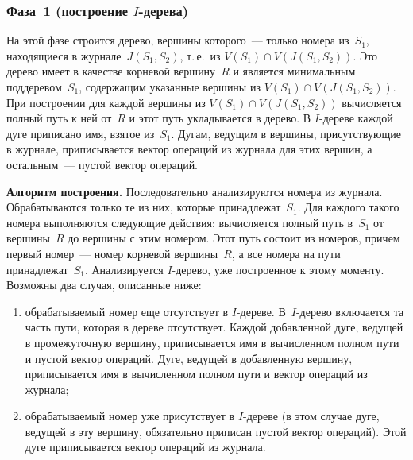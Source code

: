 \begin{multicols}{2}
\vspace*{-3pt}
\subsubsection{Фаза~1 (построение $I$-дерева)} %

      На этой фазе строится дерево, вершины которого~--- только номера 
из~$S_1$, находящиеся в журнале~$J(S_1, S_2)$, т.\,е.\ из $V(S_1)\cap V(J(S_1, 
S_2))$. Это дерево имеет в качестве корневой вершину~$R$ и является 
минимальным поддеревом~$S_1$, содержащим указанные вершины из 
$V(S_1)\cap V(J(S_1, S_2))$. При построении для каждой вершины из $V(S_1)\cap 
V(J(S_1, S_2))$ вычисляется полный путь к ней от~$R$ и этот путь укладывается 
в дерево. В $I$-дереве каждой дуге приписано имя, взятое из~$S_1$. Дугам, 
ведущим в вершины, присутствующие в журнале, приписывается вектор 
операций из журнала для этих вершин, а остальным~--- пустой вектор 
операций.

      \smallskip
      
      \noindent
      \textbf{Алгоритм построения.} Последовательно анализируются 
номера из журнала. Обрабатываются только те из них, которые 
принадлежат~$S_1$. Для каждого такого номера выполняются следующие 
действия:
вычисляется полный путь в~$S_1$ от вершины~$R$ до вершины с этим 
номером. Этот путь состоит из номеров, причем первый номер~--- номер 
корневой вершины~$R$, а все номера на пути принадлежат~$S_1$. 
Анализируется $I$-дерево, уже построенное к этому моменту. Возможны 
два случая, описанные ниже:
\begin{enumerate}[(1)]
\item обрабатываемый номер еще отсутствует в $I$-де\-ре\-ве. В~$I$-дерево 
включается та часть пути, которая в дереве отсутствует. Каждой 
до\-бав\-лен\-ной дуге, ведущей в промежуточную вершину, приписывается имя 
в вычисленном полном пути и пустой вектор операций. Дуге, ведущей в 
добавленную вершину, приписывается имя в вычисленном полном пути и 
вектор операций из журнала;\\[-15pt]
\item обрабатываемый номер уже присутствует в $I$-де\-ре\-ве (в этом случае 
дуге, ведущей в эту вершину, обязательно приписан пустой вектор 
операций). Этой дуге приписывается вектор операций из журнала.
\end{enumerate}


\end{multicols}
